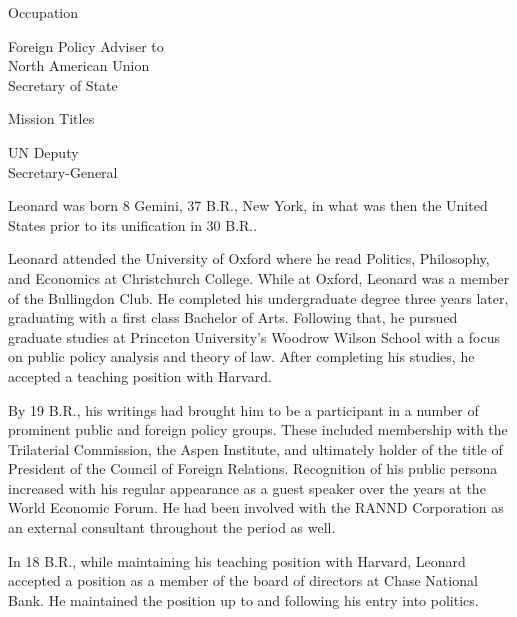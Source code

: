 {        \bTR
            \bTC Occupation \eTC
            \bTC 
                \startitemize[4]
                \startpacked
                \item Foreign Policy Adviser to\\North American Union\\Secretary of State
                \stoppacked
                \stopitemize
            \eTC
        \eTR
        
        \bTR
            \bTC Mission Titles \eTC
            \bTC 
                \startitemize[4]
                \startpacked
                \item UN Deputy\\Secretary-General
                \stoppacked
                \stopitemize
            \eTC            
        \eTR
    \eTABLEbody

\eTABLE
}

Leonard was born 8 Gemini, 37 B.R., New York, in what was then the United States prior to its unification in 30 B.R..

Leonard attended the University of Oxford where he read Politics, Philosophy, and Economics at Christchurch College. While at Oxford, Leonard was a member of the Bullingdon Club. He completed his undergraduate degree three years later, graduating with a first class Bachelor of Arts. Following that, he pursued graduate studies at Princeton University's Woodrow Wilson School with a focus on public policy analysis and theory of law. After completing his studies, he accepted a teaching position with Harvard.

By 19 B.R., his writings had brought him to be a participant in a number of prominent public and foreign policy groups. These included membership with the Trilaterial Commission, the Aspen Institute, and ultimately holder of the title of President of the Council of Foreign Relations. Recognition of his public persona increased with his regular appearance as a guest speaker over the years at the World Economic Forum. He had been involved with the RANND Corporation as an external consultant throughout the period as well.

In 18 B.R., while maintaining his teaching position with Harvard, Leonard accepted a position as a member of the board of directors at Chase National Bank. He maintained the position up to and following his entry into politics.

